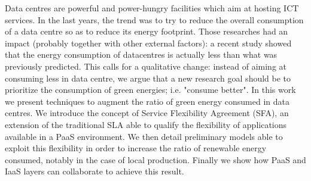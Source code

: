 Data centres are powerful and power-hungry facilities which aim at hosting ICT services.
In the last years, the trend was to try to reduce the overall consumption of a data centre so as to reduce its energy footprint.
Those researches had an impact (probably together with other external factors): a recent study showed that the energy consumption of datacentres is actually less than what was previously predicted. 
This calls for a qualitative change: instead of aiming at consuming less in data centre, we argue that a new research goal should be to prioritize the consumption of green energies; i.e. "consume better". 
In this work we present techniques to augment the ratio of green energy consumed in data centres.
We introduce the concept of Service Flexibility Agreement (SFA), an extension of the traditional SLA able to qualify the flexibility of applications available in a PaaS environment.
We then detail preliminary models able to exploit this flexibility in order to increase the ratio of renewable energy consumed, notably in the case of local production. 
Finally we show how PaaS and IaaS layers can collaborate to achieve this result.





